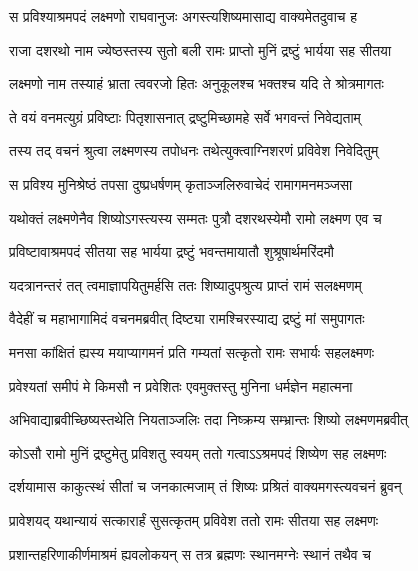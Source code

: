 
\twolineshloka
{स प्रविश्याश्रमपदं लक्ष्मणो राघवानुजः}
{अगस्त्यशिष्यमासाद्य वाक्यमेतदुवाच ह} %

\twolineshloka
{राजा दशरथो नाम ज्येष्ठस्तस्य सुतो बली}
{रामः प्राप्तो मुनिं द्रष्टुं भार्यया सह सीतया} %

\twolineshloka
{लक्ष्मणो नाम तस्याहं भ्राता त्ववरजो हितः}
{अनुकूलश्च भक्तश्च यदि ते श्रोत्रमागतः} %

\twolineshloka
{ते वयं वनमत्युग्रं प्रविष्टाः पितृशासनात्}
{द्रष्टुमिच्छामहे सर्वे भगवन्तं निवेद्यताम्} %

\twolineshloka
{तस्य तद् वचनं श्रुत्वा लक्ष्मणस्य तपोधनः}
{तथेत्युक्त्वाग्निशरणं प्रविवेश निवेदितुम्} %

\twolineshloka
{स प्रविश्य मुनिश्रेष्ठं तपसा दुष्प्रधर्षणम्}
{कृताञ्जलिरुवाचेदं रामागमनमञ्जसा} %

\twolineshloka
{यथोक्तं लक्ष्मणेनैव शिष्योऽगस्त्यस्य सम्मतः}
{पुत्रौ दशरथस्येमौ रामो लक्ष्मण एव च} %

\twolineshloka
{प्रविष्टावाश्रमपदं सीतया सह भार्यया}
{द्रष्टुं भवन्तमायातौ शुश्रूषार्थमरिंदमौ} %

\twolineshloka
{यदत्रानन्तरं तत् त्वमाज्ञापयितुमर्हसि}
{ततः शिष्यादुपश्रुत्य प्राप्तं रामं सलक्ष्मणम्} %

\twolineshloka
{वैदेहीं च महाभागामिदं वचनमब्रवीत्}
{दिष्ट्या रामश्चिरस्याद्य द्रष्टुं मां समुपागतः} %

\twolineshloka
{मनसा कांक्षितं ह्यस्य मयाप्यागमनं प्रति}
{गम्यतां सत्कृतो रामः सभार्यः सहलक्ष्मणः} %

\twolineshloka
{प्रवेश्यतां समीपं मे किमसौ न प्रवेशितः}
{एवमुक्तस्तु मुनिना धर्मज्ञेन महात्मना} %

\twolineshloka
{अभिवाद्याब्रवीच्छिष्यस्तथेति नियताञ्जलिः}
{तदा निष्क्रम्य सम्भ्रान्तः शिष्यो लक्ष्मणमब्रवीत्} %

\twolineshloka
{कोऽसौ रामो मुनिं द्रष्टुमेतु प्रविशतु स्वयम्}
{ततो गत्वाऽऽश्रमपदं शिष्येण सह लक्ष्मणः} %

\twolineshloka
{दर्शयामास काकुत्स्थं सीतां च जनकात्मजाम्}
{तं शिष्यः प्रश्रितं वाक्यमगस्त्यवचनं ब्रुवन्} %

\twolineshloka
{प्रावेशयद् यथान्यायं सत्कारार्हं सुसत्कृतम्}
{प्रविवेश ततो रामः सीतया सह लक्ष्मणः} %

\twolineshloka
{प्रशान्तहरिणाकीर्णमाश्रमं ह्यवलोकयन्}
{स तत्र ब्रह्मणः स्थानमग्नेः स्थानं तथैव च} %

